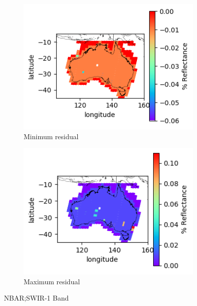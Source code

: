 \documentclass[a4paper]{article}
\begin{document}
      \begin{figure}[h!]
        \centering
          \begin{subfigure}[l]{.4\linewidth}
            \hspace{-32mm}
            \includegraphics[scale=0.9]{plots/nbar/nbar_swir_1-MinResidual.png}
            \caption{Minimum residual}
          \end{subfigure}
%
          \begin{subfigure}[r]{.4\linewidth}
            \includegraphics[scale=0.9]{plots/nbar/nbar_swir_1-MaxResidual.png}
            \caption{Maximum residual}
          \end{subfigure}
        \caption{NBAR;\@ SWIR-1 Band}\label{figure:12}
      \end{figure}

  \clearpage
\end{document}
